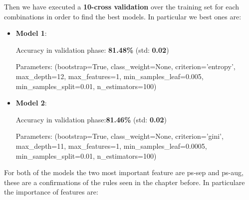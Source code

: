 \medskip

Then we have executed a \textbf{10-cross validation} over the training set for each combinations in order to find the best models.
In particular we best ones are:

\medskip

\begin{itemize}
  \item \textbf{Model 1}:
  
  Accuracy in validation phase: \textbf{81.48\%} (std: \textbf{0.02})
  
  Parameters: (bootstrap=True, class\_weight=None, criterion='entropy',
            max\_depth=12, max\_features=1, min\_samples\_leaf=0.005, min\_samples\_split=0.01, n\_estimators=100)
            
  \item \textbf{Model 2}:
  
  Accuracy in validation phase:\textbf{81.46\%} (std: \textbf{0.02})

  Parameters: (bootstrap=True, class\_weight=None, criterion='gini',
            max\_depth=11, max\_features=1, min\_samples\_leaf=0.0005, min\_samples\_split=0.01, n\_estimators=100)

\end{itemize}

\medskip

For both of the models the two most important feature are ps-sep and ps-aug, these are a confirmations of the rules seen in the chapter before. In particulare the importance of features are:

\medskip

